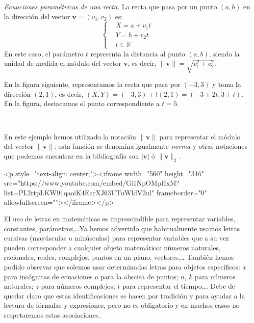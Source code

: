 \begin{ejemplo}
\emph{Ecuaciones paramétricas de una recta.}
La recta que pasa por un punto $(a,b)$ en la dirección del vector $\boldsymbol{v}=(v_1,v_2)$ es:
\[
\begin{cases}
& X = a + v_1 t\\
& Y = b + v_2 t\\
& t\in\mathbb{R}
\end{cases}
\]
En este caso, el parámetro $t$ representa la distancia al punto $(a,b)$, siendo la unidad de medida el módulo del vector $\boldsymbol{v}$, es decir, $\|\boldsymbol{v}\|=\sqrt{v_1^2+v_2^2}$.

En la figura siguiente, representamos la recta que pasa por $(-3,3)$ y toma la dirección $(2,1)$, es decir, $(X,Y)=(-3,3)+t(2,1) = (-3+2t,3+t)$. En la figura, destacamos el punto correspondiente a $t=5$.

\ \hfill
{}
\hfill
\fej
\end{ejemplo}

En este ejemplo hemos utilizado la notación $\|\boldsymbol{v}\|$ para representar el módulo del vector $\|\boldsymbol{v}\|$; esta función se denomina igualmente \emph{norma} y otras notaciones que podemos encontrar en la bibliografía son $|\boldsymbol{v}|$ ó $\|\boldsymbol{v}\|_2$.

\begin{rawhtml}
<p style="text-align: center;"><iframe width="560" height="316" src="https://www.youtube.com/embed/Gl1NpOMpHxM?list=PL2rtpLKW91qaoiK4EarXJ63UTuWldV2ul" frameborder="0" allowfullscreen=""></iframe></p>
\end{rawhtml}

El uso de letras en matemáticas es imprescindible para representar variables, constantes, parámetros,\dots Ya hemos advertido que habitualmente usamos letras cursivas (mayúsculas o minúsculas) para representar variables que a su vez pueden corresponder a cualquier objeto matemático: números naturales, racionales, reales, complejos, puntos en un plano, vectores,\dots
También hemos podido observar que solemos usar determinadas letras para objetos específicos: $x$ para incógnitas de ecuaciones o para la abscisa de puntos; $n$, $k$ para números naturales; $z$ para números complejos; $t$ para representar el tiempo,\dots
Debe de quedar claro que estas identificaciones se hacen por tradición y para ayudar a la lectura de fórmulas y expresiones, pero no es obligatorio y en muchos casos no respetaremos estas asociaciones.

